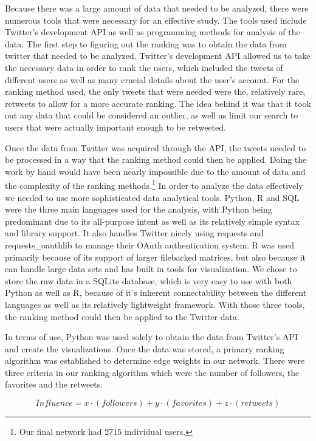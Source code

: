 Because there was a large amount of data that needed to be analyzed, there were numerous tools that were necessary for an effective study. The tools used include Twitter's development API as well as programming methods for analysis of the data. The first step to figuring out the ranking was to obtain the data from twitter that needed to be analyzed. Twitter's development API allowed us to take the necessary data in order to rank the users, which included the tweets of different users as well as many crucial details about the user's account. For the ranking method used, the only tweets that were needed were the, relatively rare, retweets to allow for a more accurate ranking. The idea behind it was that it took out any data that could be considered an outlier, as well as limit our search to users that were actually important enough to be retweeted.

Once the data from Twitter was acquired through the API, the tweets needed to be processed in a way that the ranking method could then be applied. Doing the work by hand would have been nearly impossible due to the amount of data and the complexity of the ranking methods.\footnote{Our final network had 2715 individual users.} In order to analyze the data effectively we needed to use more sophisticated data analytical tools. Python, R and SQL were the three main languages used for the analysis, with Python being predominant due to its all-purpose intent as well as its relatively simple syntax and library support. It also handles Twitter nicely using {\ttfamily requests} and {\ttfamily requests\_oauthlib} to manage their OAuth authentication system. R was used primarily because of its support of larger filebacked matrices, but also because it can handle large data sets and has built in tools for visualization. We chose to store the raw data in a SQLite database, which is very easy to use with both Python as well as R, because of it's inherent connectability between the different languages as well as its relatively lightweight framework. With those three tools, the ranking method could then be applied to the Twitter data.

In terms of use, Python was used solely to obtain the data from Twitter's API and create the visualizations. Once the data was stored, a primary ranking algorithm was established to determine edge weights in our network. There were three criteria in our ranking algorithm which were the number of followers, the favorites and the retweets.

    \begin{equation}\label{eq:influence}
        Influence=x \cdot (followers)+y \cdot (favorites)+z \cdot (retweets)
    \end{equation}

